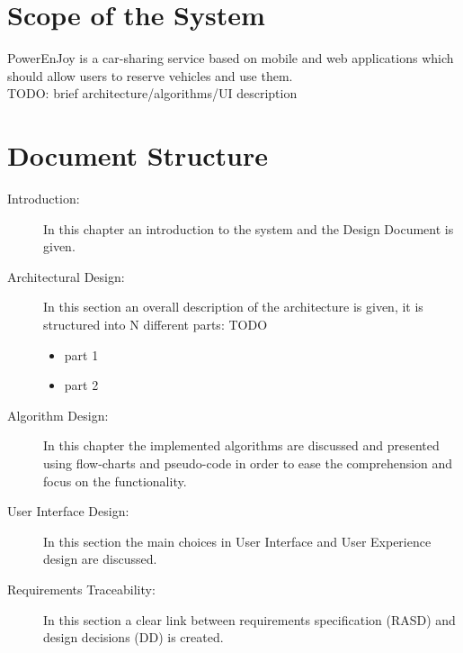 \section{Scope of the System}
PowerEnJoy is a car-sharing service based on mobile and web applications which should allow users to reserve vehicles and use them.
\\TODO: brief architecture/algorithms/UI description
\section{Document Structure}
\begin{description} 
	\item[Introduction: ] In this chapter an introduction to the system and the Design Document is given.
	\item[Architectural Design: ] In this section an overall description of the architecture is given, it is structured into N different parts: TODO
		\begin{itemize}
			\item part 1
			\item part 2
		\end{itemize}
	\item[Algorithm Design: ] In this chapter the implemented algorithms are discussed and presented using flow-charts and pseudo-code in order to ease the comprehension and focus on the functionality.
	\item[User Interface Design: ] In this section the main choices in User Interface and User Experience design are discussed.
	\item[Requirements Traceability: ] In this section a clear link between requirements specification (RASD) and design decisions (DD) is created.
\end{description}